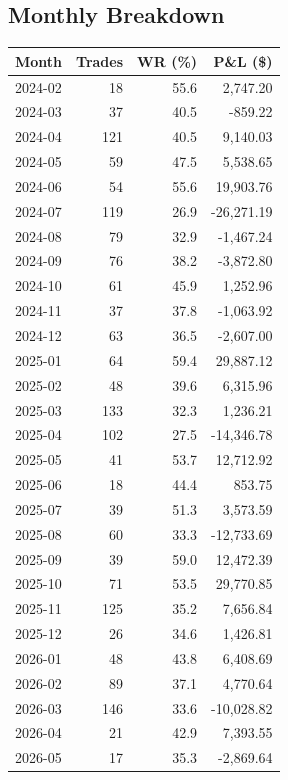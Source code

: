 \documentclass[11pt,a4paper,twoside]{article}
\begin{document}
\subsection{Monthly Breakdown}
\noindent\begin{center}
\begin{tabular}{>{\color{txtmain}}l rrr}
\toprule
\rowcolor{cardbg}
\textbf{Month} & \textbf{Trades} & \textbf{WR (\%)} & \textbf{P\&L (\$)} \\
\midrule
2024-02 & 18 & 55.6 & \textcolor{wingreen}{2,747.20} \\
2024-03 & 37 & 40.5 & \textcolor{lossred}{-859.22} \\
2024-04 & 121 & 40.5 & \textcolor{wingreen}{9,140.03} \\
2024-05 & 59 & 47.5 & \textcolor{wingreen}{5,538.65} \\
2024-06 & 54 & 55.6 & \textcolor{wingreen}{19,903.76} \\
2024-07 & 119 & 26.9 & \textcolor{lossred}{-26,271.19} \\
2024-08 & 79 & 32.9 & \textcolor{lossred}{-1,467.24} \\
2024-09 & 76 & 38.2 & \textcolor{lossred}{-3,872.80} \\
2024-10 & 61 & 45.9 & \textcolor{wingreen}{1,252.96} \\
2024-11 & 37 & 37.8 & \textcolor{lossred}{-1,063.92} \\
2024-12 & 63 & 36.5 & \textcolor{lossred}{-2,607.00} \\
2025-01 & 64 & 59.4 & \textcolor{wingreen}{29,887.12} \\
2025-02 & 48 & 39.6 & \textcolor{wingreen}{6,315.96} \\
2025-03 & 133 & 32.3 & \textcolor{wingreen}{1,236.21} \\
2025-04 & 102 & 27.5 & \textcolor{lossred}{-14,346.78} \\
2025-05 & 41 & 53.7 & \textcolor{wingreen}{12,712.92} \\
2025-06 & 18 & 44.4 & \textcolor{wingreen}{853.75} \\
2025-07 & 39 & 51.3 & \textcolor{wingreen}{3,573.59} \\
2025-08 & 60 & 33.3 & \textcolor{lossred}{-12,733.69} \\
2025-09 & 39 & 59.0 & \textcolor{wingreen}{12,472.39} \\
2025-10 & 71 & 53.5 & \textcolor{wingreen}{29,770.85} \\
2025-11 & 125 & 35.2 & \textcolor{wingreen}{7,656.84} \\
2025-12 & 26 & 34.6 & \textcolor{wingreen}{1,426.81} \\
2026-01 & 48 & 43.8 & \textcolor{wingreen}{6,408.69} \\
2026-02 & 89 & 37.1 & \textcolor{wingreen}{4,770.64} \\
2026-03 & 146 & 33.6 & \textcolor{lossred}{-10,028.82} \\
2026-04 & 21 & 42.9 & \textcolor{wingreen}{7,393.55} \\
2026-05 & 17 & 35.3 & \textcolor{lossred}{-2,869.64} \\
\bottomrule
\end{tabular}
\end{center}
\end{document}

